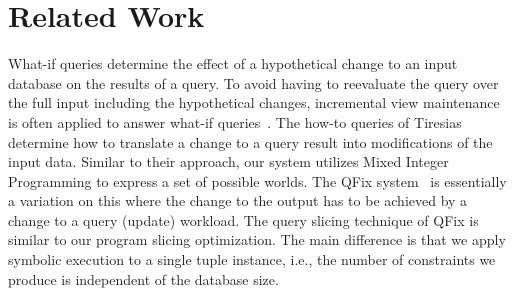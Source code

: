\section{Related Work}
\label{sec:related-work}


What-if queries determine the effect of a hypothetical change to an input database on the results of a query.
To avoid having to reevaluate the query over the full input including the hypothetical changes, incremental view maintenance is often applied to answer what-if queries~\cite{hung17,deutch13,ZG95,bourhis16}. %
The how-to queries of Tiresias~\cite{MeliouS12}  determine how to translate a  change
to a query result into modifications of the input data. Similar to their approach, our system utilizes
Mixed Integer Programming to express a set of possible worlds. %
The QFix system~\cite{wang16} is essentially a variation on this where the change to the output has to be achieved by a change to a query (update) workload.
The query slicing technique of QFix is similar to our program slicing optimization. The main difference is that
we apply symbolic execution to a single tuple instance, i.e.,
the number of constraints we produce is independent of the database size.

